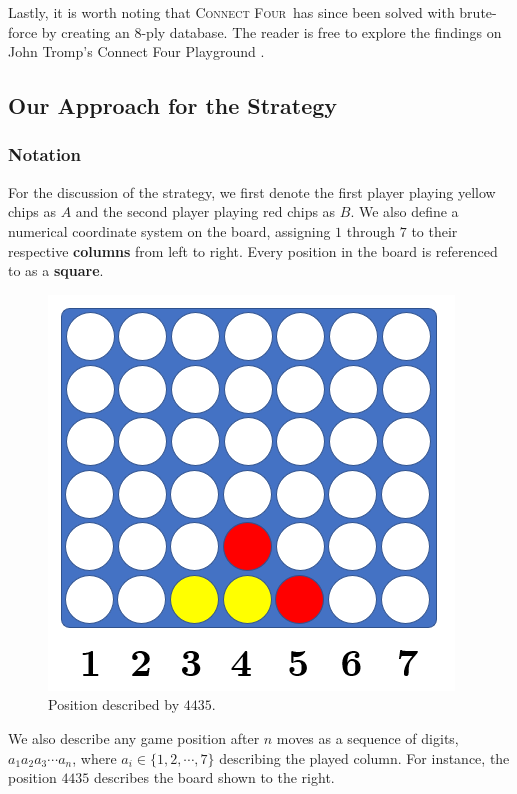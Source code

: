 \documentclass[12pt]{article}
\newcommand{\name}{\textsc{Connect Four}}
\begin{document}
Lastly, it is worth noting that \name\ has since been solved with brute-force by creating an 8-ply database. The reader is free to explore the findings on John Tromp's Connect Four Playground \cite{trompplayground}.

\subsection{Our Approach for the Strategy}

\subsubsection{Notation}
For the discussion of the strategy, we first denote the first player playing yellow chips as $A$ and the second player playing red chips as $B$.
We also define a numerical coordinate system on the board, assigning $1$ through $7$ to their respective \textbf{columns} from left to right. Every position in the board is referenced to as a \textbf{square}.

\begin{figure}
\includegraphics[width=1\linewidth]{position-2.png} 
\caption{Position described by $4435$.}
\label{fig:wrapfig}
\end{figure}

We also describe any game position after $n$ moves as a sequence of digits, $a_1a_2a_3\cdots a_n$, where $a_i \in \{1, 2, \cdots, 7\}$ describing the played column.  For instance, the position $4435$ describes the board shown to the right.
\end{document}
